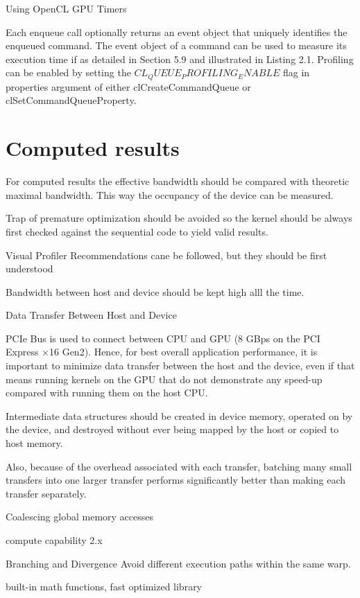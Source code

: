 Using OpenCL GPU Timers

Each enqueue call optionally returns an event object that uniquely identifies the enqueued command. The event object of a command can be used to measure its execution time if as detailed in Section 5.9 and illustrated in Listing 2.1. Profiling can be enabled by setting the $CL_QUEUE_PROFILING_ENABLE$ flag in properties argument of either clCreateCommandQueue or clSetCommandQueueProperty.\cite{nvidia2011openclbest}


\section{Computed results}
For computed results the effective bandwidth should be compared with theoretic maximal bandwidth. This way the occupancy of the device can be measured.

Trap of premature optimization should be avoided so the kernel should be always first checked against the sequential code to yield valid results.

Visual Profiler Recommendations cane be followed, but they should be first understood

Bandwidth between host and device should be kept high alll the time.

Data Transfer Between Host and Device

PCIe Bus is used to connect between CPU and GPU 
(8 GBps on the PCI Express ×16 Gen2).
Hence, for best overall application performance, it is important to minimize data
transfer between the host and the device, even if that means running kernels on the
GPU that do not demonstrate any speed-up compared with running them on the
host CPU.


Intermediate data structures should be created in device memory, operated on by
the device, and destroyed without ever being mapped by the host or copied to host
memory.\cite{nvidia2011openclbest}

Also, because of the overhead associated with each transfer, batching many small
transfers into one larger transfer performs significantly better than making each
transfer separately.\cite{nvidia2011openclbest}



Coalescing global memory accesses

compute capability 2.x

Branching and Divergence
Avoid different execution paths within the same warp.


built-in math functions, fast optimized library

